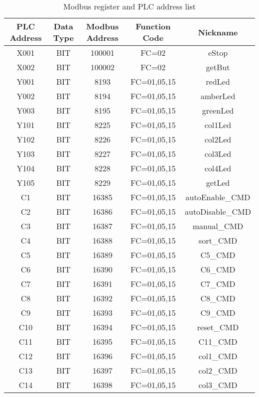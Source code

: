 

\begin{center}
    \begin{longtable}[c]{ |c|c|c|c|c| }
        \caption{Modbus register and PLC address list}\\
        \hline
        \textbf{PLC Address}	&	\textbf{Data Type}	&	\textbf{Modbus Address}	&	\textbf{Function Code}	&	\textbf{Nickname}\\ 
        \hline
        X001	&	BIT	&	100001	&	FC=02	&	eStop\\
        X002	&	BIT	&	100002	&	FC=02	&	getBut\\
        Y001	&	BIT	&	8193	&	FC=01,05,15	&	redLed\\
        Y002	&	BIT	&	8194	&	FC=01,05,15	&	amberLed\\
        Y003	&	BIT	&	8195	&	FC=01,05,15	&	greenLed\\
        Y101	&	BIT	&	8225	&	FC=01,05,15	&	col1Led\\
        Y102	&	BIT	&	8226	&	FC=01,05,15	&	col2Led\\
        Y103	&	BIT	&	8227	&	FC=01,05,15	&	col3Led\\
        Y104	&	BIT	&	8228	&	FC=01,05,15	&	col4Led\\
        Y105	&	BIT	&	8229	&	FC=01,05,15	&	getLed\\
        C1	&	BIT	&	16385	&	FC=01,05,15	&	autoEnable\_CMD\\
        C2	&	BIT	&	16386	&	FC=01,05,15	&	autoDisable\_CMD\\
        C3	&	BIT	&	16387	&	FC=01,05,15	&	manual\_CMD\\
        C4	&	BIT	&	16388	&	FC=01,05,15	&	sort\_CMD\\
        C5	&	BIT	&	16389	&	FC=01,05,15	&	C5\_CMD\\
        C6	&	BIT	&	16390	&	FC=01,05,15	&	C6\_CMD\\
        C7	&	BIT	&	16391	&	FC=01,05,15	&	C7\_CMD\\
        C8	&	BIT	&	16392	&	FC=01,05,15	&	C8\_CMD\\
        C9	&	BIT	&	16393	&	FC=01,05,15	&	C9\_CMD\\
        C10	&	BIT	&	16394	&	FC=01,05,15	&	reset\_CMD\\
        C11	&	BIT	&	16395	&	FC=01,05,15	&	C11\_CMD\\
        C12	&	BIT	&	16396	&	FC=01,05,15	&	col1\_CMD\\
        C13	&	BIT	&	16397	&	FC=01,05,15	&	col2\_CMD\\
        C14	&	BIT	&	16398	&	FC=01,05,15	&	col3\_CMD\\

\end{longtable}
\end{center}
